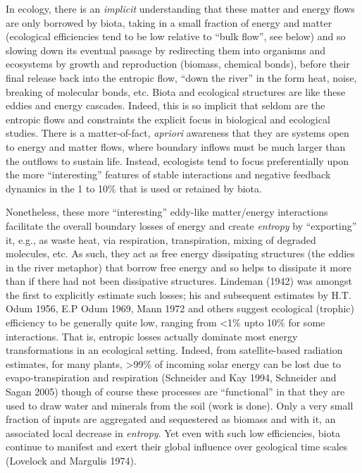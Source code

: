 \documentclass[11pt,letterpaper,]{paper}
\begin{document}
In ecology, there is an \emph{implicit} understanding that these matter
and energy flows are only borrowed by biota, taking in a small fraction
of energy and matter (ecological efficiencies tend to be low relative to
``bulk flow'', see below) and so slowing down its eventual passage by
redirecting them into organisms and ecosystems by growth and
reproduction (biomass, chemical bonds), before their final release back
into the entropic flow, ``down the river'' in the form heat, noise,
breaking of molecular bonds, etc. Biota and ecological structures are
like these eddies and energy cascades. Indeed, this is so implicit that
seldom are the entropic flows and constraints the explicit focus in
biological and ecological studies. There is a matter-of-fact,
\emph{apriori} awareness that they are systems open to energy and matter
flows, where boundary inflows must be much larger than the outflows to
sustain life. Instead, ecologists tend to focus preferentially upon the
more ``interesting'' features of stable interactions and negative
feedback dynamics in the 1 to 10\% that is used or retained by biota.

Nonetheless, these more ``interesting'' eddy-like matter/energy
interactions facilitate the overall boundary losses of energy and create
\emph{entropy} by ``exporting'' it, e.g., as waste heat, via
respiration, transpiration, mixing of degraded molecules, etc. As such,
they act as free energy dissipating structures (the eddies in the river
metaphor) that borrow free energy and so helps to dissipate it more than
if there had not been dissipative structures. Lindeman (1942) was
amongst the first to explicitly estimate such losses; his and subsequent
estimates by H.T. Odum 1956, E.P Odum 1969, Mann 1972 and others suggest
ecological (trophic) efficiency to be generally quite low, ranging from
\textless1\% upto 10\% for some interactions. That is, entropic losses
actually dominate most energy transformations in an ecological setting.
Indeed, from satellite-based radiation estimates, for many plants,
\textgreater99\% of incoming solar energy can be lost due to
evapo-transpiration and respiration (Schneider and Kay 1994, Schneider
and Sagan 2005) though of course these processes are ``functional'' in
that they are used to draw water and minerals from the soil (work is
done). Only a very small fraction of inputs are aggregated and
sequestered as biomass and with it, an associated local decrease in
\emph{entropy}. Yet even with such low efficiencies, biota continue to
manifest and exert their global influence over geological time scales
(Lovelock and Margulis 1974).
\end{document}
